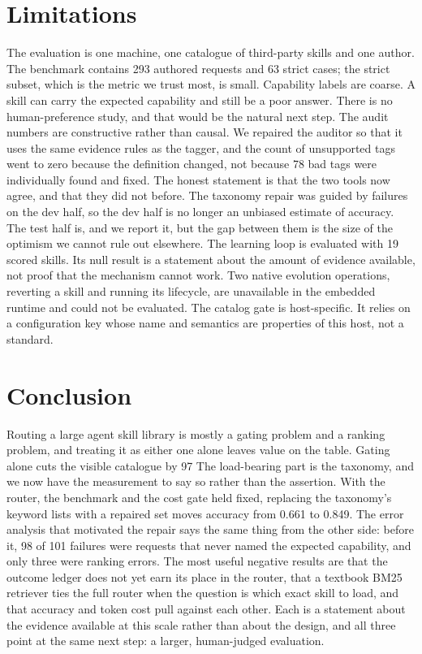 \documentclass[sigconf,acmsmall]{acmart}
\begin{document}
\section{Limitations}
The evaluation is one machine, one catalogue of third-party skills and one author. The benchmark contains 293 authored requests and 63 strict cases; the strict subset, which is the metric we trust most, is small.
Capability labels are coarse. A skill can carry the expected capability and still be a poor answer. There is no human-preference study, and that would be the natural next step.
The audit numbers are constructive rather than causal. We repaired the auditor so that it uses the same evidence rules as the tagger, and the count of unsupported tags went to zero because the definition changed, not because 78 bad tags were individually found and fixed. The honest statement is that the two tools now agree, and that they did not before.
The taxonomy repair was guided by failures on the dev half, so the dev half is no longer an unbiased estimate of accuracy. The test half is, and we report it, but the gap between them is the size of the optimism we cannot rule out elsewhere.
The learning loop is evaluated with 19 scored skills. Its null result is a statement about the amount of evidence available, not proof that the mechanism cannot work.
Two native evolution operations, reverting a skill and running its lifecycle, are unavailable in the embedded runtime and could not be evaluated.
The catalog gate is host-specific. It relies on a configuration key whose name and semantics are properties of this host, not a standard.

\section{Conclusion}
Routing a large agent skill library is mostly a gating problem and a ranking problem, and treating it as either one alone leaves value on the table. Gating alone cuts the visible catalogue by 97%
The load-bearing part is the taxonomy, and we now have the measurement to say so rather than the assertion. With the router, the benchmark and the cost gate held fixed, replacing the taxonomy's keyword lists with a repaired set moves accuracy from 0.661 to 0.849. The error analysis that motivated the repair says the same thing from the other side: before it, 98 of 101 failures were requests that never named the expected capability, and only three were ranking errors.
The most useful negative results are that the outcome ledger does not yet earn its place in the router, that a textbook BM25 retriever ties the full router when the question is which exact skill to load, and that accuracy and token cost pull against each other. Each is a statement about the evidence available at this scale rather than about the design, and all three point at the same next step: a larger, human-judged evaluation.
\end{document}
